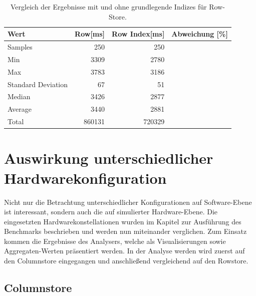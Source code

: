 \begin{table}[H]
    \begin{tabularx}{10cm}{lrrr}
        \toprule
        Wert                & Row[ms] & Row Index[ms]   & Abweichung [\%]\\
        \toprule
        Samples             & 250     &  250            &       \\
        \midrule
        Min                 & 3309    &  2780           &       \\
        Max                 & 3783    &  3186           &       \\
        Standard Deviation  & 67      &  51             &       \\
        \midrule
        Median              & 3426    &  2877           &       \\
        Average             & 3440    &  2881           &       \\
        \midrule
        Total               & 860131  &  720329         &       \\
        \bottomrule
    \end{tabularx}
\caption{Vergleich der Ergebnisse mit und ohne grundlegende Indizes für Row-Store.}
\label{tab:basic_index_row}
\end{table}


\section{Auswirkung unterschiedlicher Hardwarekonfiguration}\label{auswertung:hardware}

Nicht nur die Betrachtung unterschiedlicher Konfigurationen auf Software-Ebene ist interessant, sondern auch die auf simulierter Hardware-Ebene. Die eingesetzten Hardwarekonstellationen wurden im Kapitel zur Ausführung des Benchmarks beschrieben und werden nun miteinander verglichen. Zum Einsatz kommen die Ergebnisse des Analysers, welche als Visualisierungen sowie Aggregaten-Werten präsentiert werden. In der Analyse werden wird zuerst auf den Columnstore eingegangen und anschließend vergleichend auf den Rowstore. 

\subsection{Columnstore}

